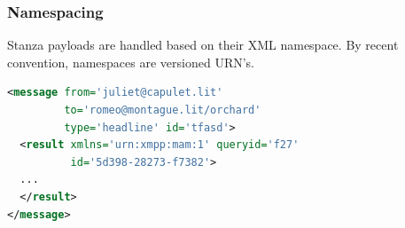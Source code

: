 \documentclass[xelatex,aspectratio=169]{beamer}
\begin{document}

\begin{frame}[fragile]
	\frametitle{Namespacing}
	\begin{flushleft}
		Stanza payloads are handled based on their XML namespace. By recent
		convention, namespaces are versioned URN's.
	\end{flushleft}
\begin{lstlisting}[frame=single,language=xml]
<message from='juliet@capulet.lit'
         to='romeo@montague.lit/orchard'
         type='headline' id='tfasd'>
  <result xmlns='urn:xmpp:mam:1' queryid='f27'
          id='5d398-28273-f7382'>
  ...
  </result>
</message>
\end{lstlisting}
\end{frame}
\end{document}

